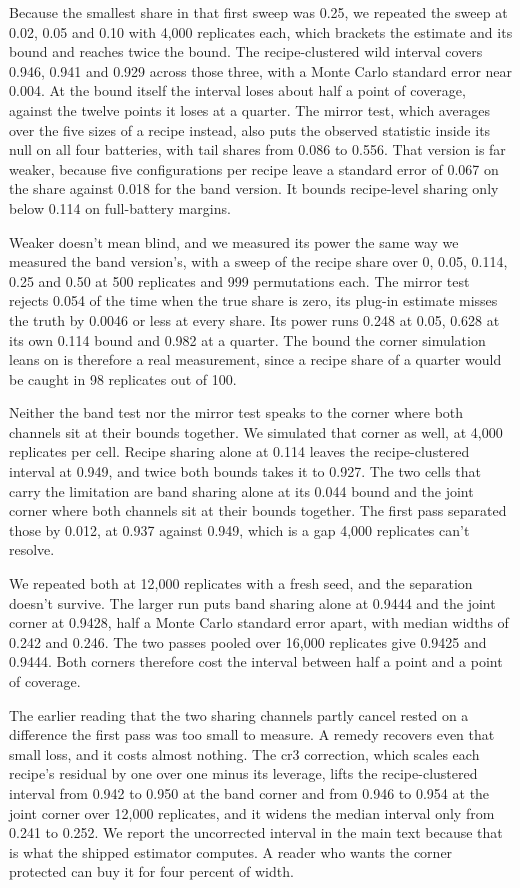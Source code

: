 Because the smallest share in that first sweep was 0.25, we repeated the sweep at 0.02, 0.05 and 0.10 with 4,000 replicates each, which brackets the estimate and its bound and reaches twice the bound. The recipe-clustered wild interval covers 0.946, 0.941 and 0.929 across those three, with a Monte Carlo standard error near 0.004. At the bound itself the interval loses about half a point of coverage, against the twelve points it loses at a quarter. The mirror test, which averages over the five sizes of a recipe instead, also puts the observed statistic inside its null on all four batteries, with tail shares from 0.086 to 0.556. That version is far weaker, because five configurations per recipe leave a standard error of 0.067 on the share against 0.018 for the band version. It bounds recipe-level sharing only below 0.114 on full-battery margins.

Weaker doesn't mean blind, and we measured its power the same way we measured the band version's, with a sweep of the recipe share over 0, 0.05, 0.114, 0.25 and 0.50 at 500 replicates and 999 permutations each. The mirror test rejects 0.054 of the time when the true share is zero, its plug-in estimate misses the truth by 0.0046 or less at every share. Its power runs 0.248 at 0.05, 0.628 at its own 0.114 bound and 0.982 at a quarter. The bound the corner simulation leans on is therefore a real measurement, since a recipe share of a quarter would be caught in 98 replicates out of 100.

Neither the band test nor the mirror test speaks to the corner where both channels sit at their bounds together. We simulated that corner as well, at 4,000 replicates per cell. Recipe sharing alone at 0.114 leaves the recipe-clustered interval at 0.949, and twice both bounds takes it to 0.927. The two cells that carry the limitation are band sharing alone at its 0.044 bound and the joint corner where both channels sit at their bounds together. The first pass separated those by 0.012, at 0.937 against 0.949, which is a gap 4,000 replicates can't resolve.

We repeated both at 12,000 replicates with a fresh seed, and the separation doesn't survive. The larger run puts band sharing alone at 0.9444 and the joint corner at 0.9428, half a Monte Carlo standard error apart, with median widths of 0.242 and 0.246. The two passes pooled over 16,000 replicates give 0.9425 and 0.9444. Both corners therefore cost the interval between half a point and a point of coverage.

The earlier reading that the two sharing channels partly cancel rested on a difference the first pass was too small to measure. A remedy recovers even that small loss, and it costs almost nothing. The cr3 correction, which scales each recipe's residual by one over one minus its leverage, lifts the recipe-clustered interval from 0.942 to 0.950 at the band corner and from 0.946 to 0.954 at the joint corner over 12,000 replicates, and it widens the median interval only from 0.241 to 0.252. We report the uncorrected interval in the main text because that is what the shipped estimator computes. A reader who wants the corner protected can buy it for four percent of width.

